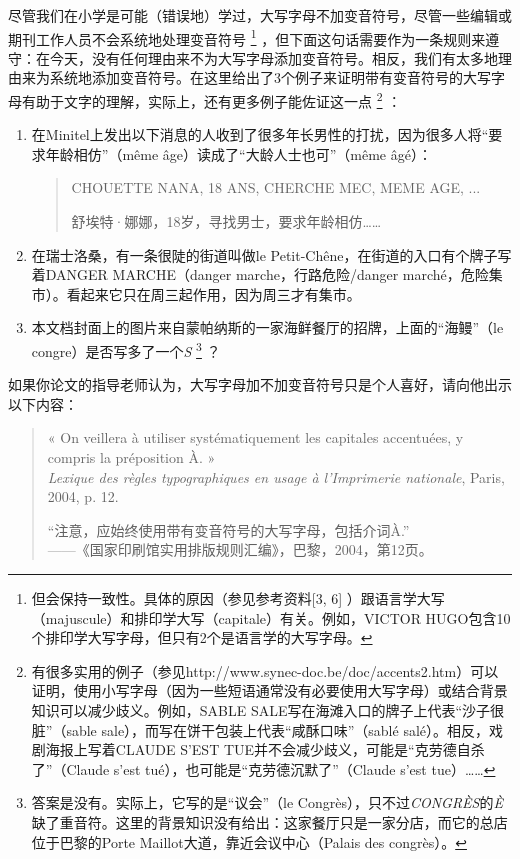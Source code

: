 尽管我们在小学是可能（错误地）学过，大写字母不加变音符号，尽管一些编辑或期刊工作人员不会系统地处理变音符号
    \footnote{但会保持一致性。具体的原因（参见参考资料[3, 6]%
    ）跟语言学大写（majuscule）和排印学大写（capitale）有关。例如，VICTOR HUGO包含10个排印学大写字母，但只有2个是语言学的大写字母。}
，但下面这句话需要作为一条规则来遵守：在今天，没有任何理由来不为大写字母添加变音符号。相反，我们有太多地理由来为系统地添加变音符号。在这里给出了3个例子来证明带有变音符号的大写字母有助于文字的理解，实际上，还有更多例子能佐证这一点
    \footnote{有很多实用的例子（参见http://www.synec-doc.be/doc/accents2.htm）可以证明，使用小写字母（因为一些短语通常没有必要使用大写字母）或结合背景知识可以减少歧义。例如，SABLE SALE写在海滩入口的牌子上代表``沙子很脏''（sable sale），而写在饼干包装上代表``咸酥口味''（sablé salé）。相反，戏剧海报上写着CLAUDE S'EST TUE并不会减少歧义，可能是``克劳德自杀了''（Claude s'est tué），也可能是``克劳德沉默了''（Claude s'est tue）……}
：

\begin{enumerate}
    \item 在Minitel上发出以下消息的人收到了很多年长男性的打扰，因为很多人将``要求年龄相仿''（même âge）读成了``大龄人士也可''（même âgé）：
    \begin{quote}
        CHOUETTE NANA, 18 ANS, CHERCHE MEC, MEME AGE, ... 
        \begin{bil}
            舒埃特·娜娜，18岁，寻找男士，要求年龄相仿……
        \end{bil}
    \end{quote}
    \item 在瑞士洛桑，有一条很陡的街道叫做le Petit-Chêne，在街道的入口有个牌子写着DANGER MARCHE（danger marche，行路危险/danger marché，危险集市）。看起来它只在周三起作用，因为周三才有集市。
    \item 本文档封面上的图片来自蒙帕纳斯的一家海鲜餐厅的招牌，上面的``海鳗''（le congre）是否写多了一个\emph{S}%
        \footnote{答案是没有。实际上，它写的是``议会''（le Congrès），只不过\emph{CONGRÈS}的\emph{È}缺了重音符。这里的背景知识没有给出：这家餐厅只是一家分店，而它的总店位于巴黎的Porte Maillot大道，靠近会议中心（Palais des congrès）。}
    ？
\end{enumerate}

如果你论文的指导老师认为，大写字母加不加变音符号只是个人喜好，请向他出示以下内容：

\begin{quote}
    « On veillera à utiliser systématiquement les capitales accentuées, y compris la préposition À. »\\
    \emph{Lexique des règles typographiques en usage à l'Imprimerie nationale}, Paris, 2004, p. 12.
    \begin{bil}
        ``注意，应始终使用带有变音符号的大写字母，包括介词À.''\\
        ——《国家印刷馆实用排版规则汇编》，巴黎，2004，第12页。
    \end{bil}
\end{quote}

